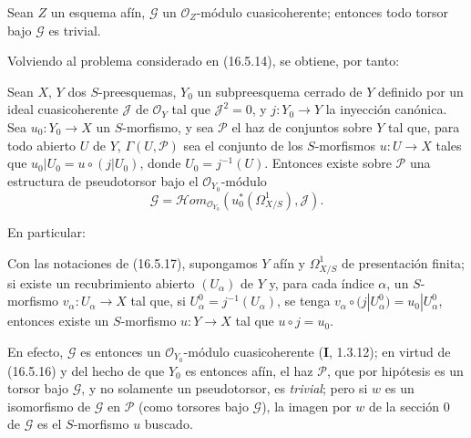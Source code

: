 \begin{proposition}[16.5.16]
\label{IV.16.5.16}
Sean $Z$ un esquema afín, $\mathscr{G}$ un $\mathcal{O}_Z$-módulo
cuasicoherente; entonces todo torsor bajo $\mathscr{G}$ es trivial.
\end{proposition}

Volviendo al problema considerado en (16.5.14), se obtiene, por tanto:

\begin{proposition}[16.5.17]
\label{IV.16.5.17}
Sean $X$, $Y$ dos $S$-preesquemas, $Y_0$ un subpreesquema cerrado de $Y$
definido por un ideal cuasicoherente $\mathscr{J}$ de $\mathcal{O}_Y$ tal que
$\mathscr{J}^2=0$, y $j:Y_0\to Y$ la inyección canónica. Sea
$u_0:Y_0\to X$ un $S$-morfismo, y sea $\mathscr{P}$ el haz de conjuntos sobre
$Y$ tal que, para todo abierto $U$ de $Y$, $\Gamma(U,\mathscr{P})$ sea
el conjunto de los $S$-morfismos $u:U\to X$ tales que
$u_0|U_0=u\circ(j|U_0)$, donde $U_0=j^{-1}(U)$. Entonces existe sobre
$\mathscr{P}$ una estructura de pseudotorsor bajo el
$\mathcal{O}_{Y_0}$-módulo
\[
  \mathscr{G}=\mathscr{H}om_{\mathcal{O}_{Y_0}}
  (u_0^*(\varOmega_{X/S}^1),\mathscr{J}).
\]
\end{proposition}

En particular:

\begin{corollary}[16.5.18]
\label{IV.16.5.18}
Con las notaciones de \textup{(16.5.17)}, supongamos $Y$ afín y $\varOmega_{X/S}^1$ de
presentación finita; si existe un recubrimiento abierto $(U_\alpha)$ de $Y$
y, para cada índice $\alpha$, un $S$-morfismo $v_\alpha:U_\alpha\to X$
tal que, si $U_\alpha^0=j^{-1}(U_\alpha)$, se tenga
$v_\alpha\circ(j|U_\alpha^0)=u_0|U_\alpha^0$, entonces existe un
$S$-morfismo $u:Y\to X$ tal que $u\circ j=u_0$.
\end{corollary}

En efecto, $\mathscr{G}$ es entonces un $\mathcal{O}_{Y_0}$-módulo
cuasicoherente (\textbf I, 1.3.12); en virtud de (16.5.16) y del hecho de que $Y_0$ es
entonces afín, el haz $\mathscr{P}$, que por hipótesis es un torsor bajo
$\mathscr{G}$, y no solamente un pseudotorsor, es \emph{trivial}; pero si
$w$ es un isomorfismo de $\mathscr{G}$ en $\mathscr{P}$ (como
torsores bajo $\mathscr{G}$), la imagen por $w$ de la sección 0 de
$\mathscr{G}$ es el $S$-morfismo $u$ buscado.
